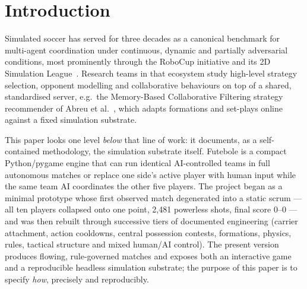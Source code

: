 \documentclass[10pt,twocolumn]{article}
\begin{document}
\section{Introduction}\label{sec:intro}

Simulated soccer has served for three decades as a canonical benchmark for
multi-agent coordination under continuous, dynamic and partially adversarial
conditions, most prominently through the RoboCup initiative and its 2D
Simulation League~\cite{kitano1997robocup,chen2003manual}. Research teams in
that ecosystem study high-level strategy selection, opponent modelling and
collaborative behaviours on top of a shared, standardised server, e.g.\ the
Memory-Based Collaborative Filtering strategy recommender of Abreu et
al.~\cite{abreu2014improving}, which adapts formations and set-plays online
against a fixed simulation substrate.

This paper looks one level \emph{below} that line of work: it documents, as
a self-contained methodology, the simulation substrate itself. Futebole is a
compact Python/pygame engine that can run identical AI-controlled teams in
full autonomous matches or replace one side's active player with human input
while the same team AI coordinates the other five players. The project began
as a minimal prototype whose first observed match degenerated into a static
scrum --- all ten players collapsed onto one point, 2{,}481 powerless shots,
final score 0--0 --- and was then rebuilt through successive tiers of
documented engineering (carrier attachment, action cooldowns, central
possession contests, formations, physics, rules, tactical structure and
mixed human/AI control). The present version produces flowing, rule-governed
matches and exposes both an interactive game and a reproducible headless
simulation substrate; the purpose of this paper is to specify \emph{how},
precisely and reproducibly.
\end{document}
